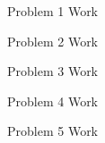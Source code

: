 \documentclass[10pt]{../usamts}
\begin{document}
\begin{solution}
Problem 1 Work
\end{solution}


\begin{solution}
Problem 2 Work
\end{solution}


\begin{solution}
Problem 3 Work
\end{solution}


\begin{solution}
Problem 4 Work
\end{solution}

\begin{solution}
Problem 5 Work
\end{solution}
\end{document}
